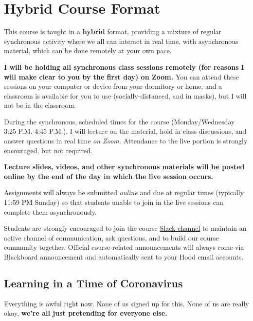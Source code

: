 \documentclass{article}
\begin{document}
\clearpage

\hypertarget{hybrid-course-format}{%
\section*{Hybrid Course Format}\label{hybrid-course-format}}

This course is taught in a \textbf{hybrid} format, providing a mixture
of regular synchronous activity where we all can interact in real time,
with asynchronous material, which can be done remotely at your own pace.

\textbf{I will be holding all synchronous class sessions remotely (for
reasons I will make clear to you by the first day) on Zoom.} You can
attend these sessions on your computer or device from your dormitory or
home, and a classroom is available for you to use (socially-distanced,
and in masks), but I will not be in the classroom.

During the synchronous, scheduled times for the course (Monday/Wednesday
3:25 P.M.-4:45 P.M.), I will lecture on the material, hold in-class
discussions, and answer questions in real time \emph{on Zoom.}
Attendance to the live portion is strongly encouraged, but not required.

\textbf{Lecture slides, videos, and other synchronous materials will be
posted online by the end of the day in which the live session occurs.}

Assignments will always be submitted \emph{online} and due at regular
times (typically 11:59 PM Sunday) so that students unable to join in the
live sessions can complete them asynchronously.

Students are strongly encouraged to join the course
\href{https://hoodcollegeeconomics.slack.com}{Slack channel} to maintain
an active channel of communication, ask questions, and to build our
course community together. Official course-related announcements will
always come via Blackboard announcement and automatically sent to your
Hood email accounts.

\hypertarget{learning-in-a-time-of-coronavirus}{%
\subsection*{Learning in a Time of
Coronavirus}\label{learning-in-a-time-of-coronavirus}}

Everything is awful right now. None of us signed up for this. None of us
are really okay, \textbf{we're all just pretending for everyone else.}
\end{document}
